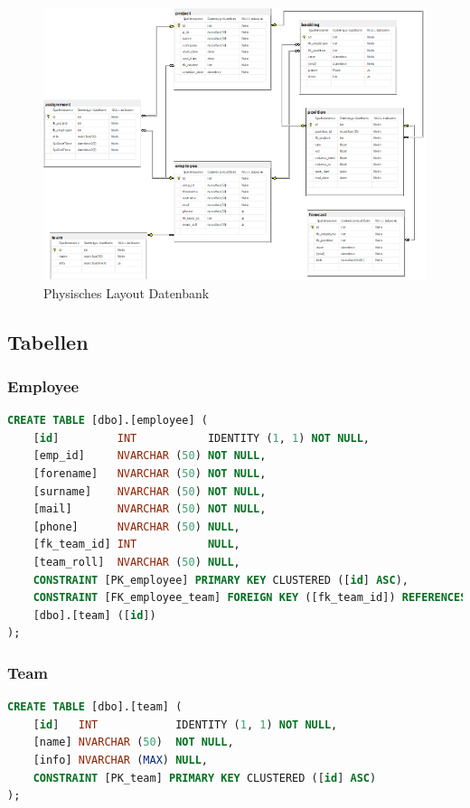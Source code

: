\documentclass{article}
\begin{document}
\begin{figure}[h]
    \centering
    \includegraphics[width= \textwidth]{images/datenbankphysisches-Layout.png}
    \caption{Physisches Layout Datenbank}
    \label{fig:beispiel}
\end{figure}

\newpage

\subsection{Tabellen}

\subsubsection{Employee}
\begin{lstlisting}[language=Sql, caption= Create Table Statement für Employee Table]
    CREATE TABLE [dbo].[employee] (
    [id]         INT           IDENTITY (1, 1) NOT NULL,
    [emp_id]     NVARCHAR (50) NOT NULL,
    [forename]   NVARCHAR (50) NOT NULL,
    [surname]    NVARCHAR (50) NOT NULL,
    [mail]       NVARCHAR (50) NOT NULL,
    [phone]      NVARCHAR (50) NULL,
    [fk_team_id] INT           NULL,
    [team_roll]  NVARCHAR (50) NULL,
    CONSTRAINT [PK_employee] PRIMARY KEY CLUSTERED ([id] ASC),
    CONSTRAINT [FK_employee_team] FOREIGN KEY ([fk_team_id]) REFERENCES 
    [dbo].[team] ([id])
);
        \end{lstlisting}
\subsubsection{Team}
\begin{lstlisting}[language=Sql, caption= Create Table Statement für Team Table]
    CREATE TABLE [dbo].[team] (
    [id]   INT            IDENTITY (1, 1) NOT NULL,
    [name] NVARCHAR (50)  NOT NULL,
    [info] NVARCHAR (MAX) NULL,
    CONSTRAINT [PK_team] PRIMARY KEY CLUSTERED ([id] ASC)
);

         \end{lstlisting}
\end{document}
